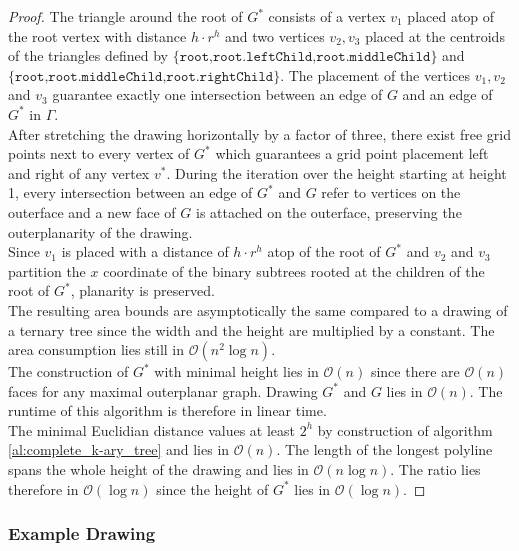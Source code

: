 \begin{proof}
	The triangle around the root of $G^*$ consists of a vertex $v_1$ placed atop of the root vertex with distance $h\cdot r^h$ and two vertices $v_2,v_3$ placed at the centroids of the triangles defined by $\{\texttt{root,root.leftChild,root.middleChild}\}$ and $\{\texttt{root,root.middleChild,root.rightChild}\}$. The placement of the vertices $v_1,v_2$ and $v_3$ guarantee exactly one intersection between an edge of $G$ and an edge of $G^*$ in $\Gamma$.\\
	After stretching the drawing horizontally by a factor of three, there exist free grid points next to every vertex of $G^*$ which guarantees a grid point placement left and right of any vertex $v^*$. During the iteration over the height starting at height 1, every intersection between an edge of $G^*$ and $G$ refer to vertices on the outerface and a new face of $G$ is attached on the outerface, preserving the outerplanarity of the drawing.\\
	Since $v_1$ is placed with a distance of $h\cdot r^h$ atop of the root of $G^*$ and $v_2$ and $v_3$ partition the $x$ coordinate of the binary subtrees rooted at the children of the root of $G^*$, planarity is preserved.\\
	The resulting area bounds are asymptotically the same compared to a drawing of a ternary tree since the width and the height are multiplied by a constant. The area consumption lies still in $\mathcal{O}(n^2 \log n)$.\\
	The construction of $G^*$ with minimal height lies in $\mathcal{O}(n)$ since there are $\mathcal{O}(n)$ faces for any maximal outerplanar graph. Drawing $G^*$ and $G$ lies in $\mathcal{O}(n)$. The runtime of this algorithm is therefore in linear time.\\
	The minimal Euclidian distance values at least $2^h$ by construction of algorithm  \ref{al:complete_k-ary_tree} and lies in $\mathcal{O}(n)$. The length of the longest polyline spans the whole height of the drawing and lies in $\mathcal{O}(n \log n)$. The ratio lies therefore in $\mathcal{O}(\log n)$ since the height of $G^*$ lies in $\mathcal{O}(\log n)$.
\end{proof}
\subsubsection{Example Drawing}

